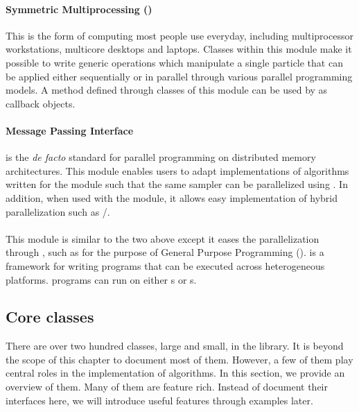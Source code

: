 \paragraph{Symmetric Multiprocessing (\smp)}

This is the form of computing most people use everyday, including multiprocessor workstations, multicore desktops and laptops. Classes within this module make it possible to write generic operations which manipulate a single particle that can be applied either sequentially or in parallel through various parallel programming models. A method defined through classes of this module can be used by  as callback objects.

\paragraph{Message Passing Interface}

\mpi is the \emph{de facto} standard for parallel programming on distributed memory architectures. This module enables users to adapt implementations of algorithms written for the \smp module such that the same sampler can be parallelized using \mpi. In addition, when used with the \smp module, it allows easy implementation of hybrid parallelization such as \mpi/\openmp.

\paragraph{\opencl}

This module is similar to the two above except it eases the parallelization through \opencl, such as for the purpose of General Purpose \gpu Programming (\gpgpu). \opencl is a framework for writing programs that can be executed across heterogeneous platforms. \opencl programs can run on either \cpu{}s or \gpu{}s.

\subsection{Core classes}
\label{sub:Core classes}

There are over two hundred classes, large and small, in the \vsmc library. It is beyond the scope of this chapter to document most of them. However, a few of them play central roles in the implementation of \smc algorithms. In this section, we provide an overview of them. Many of them are feature rich. Instead of document their interfaces here, we will introduce useful features through examples later.

